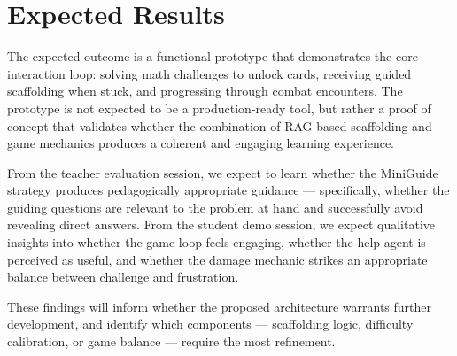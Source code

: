 \section{Expected Results}


The expected outcome is a functional prototype that demonstrates the core interaction loop: solving math challenges to unlock cards, receiving guided scaffolding when stuck, and progressing through combat encounters. The prototype is not expected to be a production-ready tool, but rather a proof of concept that validates whether the combination of RAG-based scaffolding and game mechanics produces a coherent and engaging learning experience.

From the teacher evaluation session, we expect to learn whether the MiniGuide strategy produces pedagogically appropriate guidance — specifically, whether the guiding questions are relevant to the problem at hand and successfully avoid revealing direct answers. From the student demo session, we expect qualitative insights into whether the game loop feels engaging, whether the help agent is perceived as useful, and whether the damage mechanic strikes an appropriate balance between challenge and frustration.

These findings will inform whether the proposed architecture warrants further development, and identify which components — scaffolding logic, difficulty calibration, or game balance — require the most refinement.